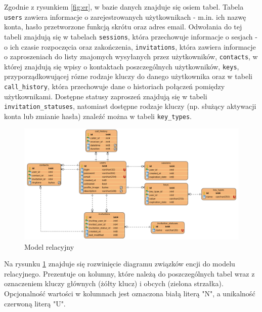 \documentclass{article}
\begin{document}
    Zgodnie z rysunkiem \ref{fig:er}, w bazie danych znajduje się osiem tabel. Tabela \texttt{users} zawiera informacje o zarejestrowanych użytkownikach - m.in. ich nazwę konta, hasło przetworzone funkcją skrótu oraz adres email. Odwołania do tej tabeli znajdują się w tabelach \texttt{sessions}, która przechowuje informacje o sesjach - o ich czasie rozpoczęcia oraz zakończenia, \texttt{invitations}, która zawiera informacje o zaproszeniach do listy znajomych wysyłanych przez użytkowników, \texttt{contacts}, w której znajdują się wpisy o kontaktach poszczególnych użytkowników, \texttt{keys}, przyporządkowującej rózne rodzaje kluczy do danego użytkownika oraz w tabeli \texttt{call\_history}, która przechowuje dane o historiach połączeń pomiędzy użytkownikami. Dostępne statusy zaproszeń znajdują się w tabeli \texttt{invitation\_statuses}, natomiast dostępne rodzaje kluczy (np. służący aktywacji konta lub zmianie hasła) znaleźć można w tabeli \texttt{key\_types}.

    \begin{figure}[H]
      \centering
        \includegraphics[width=1.0\linewidth]{assets/rel.png}
        \caption[]{Model relacyjny}
        \label{fig:rel}
    \end{figure}

    Na rysunku \ref{fig:rel} znajduje się rozwinięcie diagramu związków encji do modelu relacyjnego. Prezentuje on kolumny, które należą do poszczególnych tabel wraz z oznaczeniem kluczy głównych (żółty klucz) i obcych (zielona strzałka). Opcjonalność wartości w kolumnach jest oznaczona białą literą "N", a unikalność czerwoną literą "U".
\end{document}
